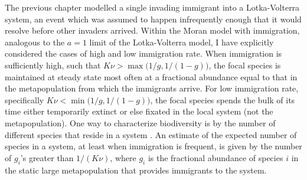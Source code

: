 The previous chapter modelled a single invading immigrant into a Lotka-Volterra system, an event which was assumed to happen infrequently enough that it would resolve before other invaders arrived. 
Within the Moran model with immigration, analogous to the $a=1$ limit of the Lotka-Volterra model, I have explicitly considered the cases of high and low immigration rate. 
When immigration is sufficiently high, such that $K\nu > \max\big(1/g,1/(1-g)\big)$, the focal species is maintained at steady state most often at a fractional abundance equal to that in the metapopulation from which the immigrants arrive. 
For low immigration rate, specifically $K\nu < \min\big(1/g,1/(1-g)\big)$, the focal species spends the bulk of its time either temporarily extinct or else fixated in the local system (not the metapopulation). 
One way to characterize biodiversity is by the number of different species that reside in a system \cite{May1999,Hubbell2001,Chesson2000}. 
An estimate of the expected number of species in a system, at least when immigration is frequent, is given by the number of $g_i$'s greater than $1/(K\nu)$, where $g_i$ is the fractional abundance of species $i$ in the static large metapopulation that provides immigrants to the system. %


